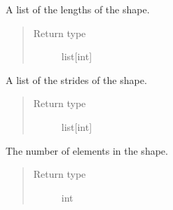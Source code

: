 \documentclass[letterpaper,10pt,english]{sphinxmanual}
\begin{document}

\begin{fulllineitems}
\label{\detokenize{reference/py:migraphx.lens}}
\sphinxAtStartPar
A list of the lengths of the shape.
\begin{quote}\begin{description}
\item[{Return type}] \leavevmode
\sphinxAtStartPar
list{[}int{]}

\end{description}\end{quote}

\end{fulllineitems}


\begin{fulllineitems}
\label{\detokenize{reference/py:migraphx.strides}}
\sphinxAtStartPar
A list of the strides of the shape.
\begin{quote}\begin{description}
\item[{Return type}] \leavevmode
\sphinxAtStartPar
list{[}int{]}

\end{description}\end{quote}

\end{fulllineitems}


\begin{fulllineitems}
\label{\detokenize{reference/py:migraphx.elements}}
\sphinxAtStartPar
The number of elements in the shape.
\begin{quote}\begin{description}
\item[{Return type}] \leavevmode
\sphinxAtStartPar
int

\end{description}\end{quote}

\end{fulllineitems}
\end{document}

